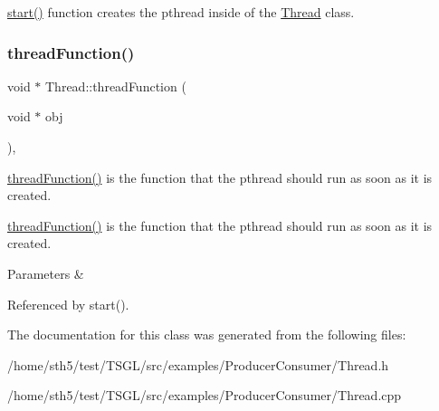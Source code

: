 \hyperlink{class_thread_a1f53ee62bd30a7924186ef26150ce262}{start()} function creates the pthread inside of the \hyperlink{class_thread}{Thread} class. \mbox{\label{class_thread_ae54fcbb9f00b8356b23795ac477f9577}} 
\subsubsection{\texorpdfstring{thread\+Function()}{threadFunction()}}
{\footnotesize\ttfamily void $\ast$ Thread\+::thread\+Function (\begin{DoxyParamCaption}\item[{void $\ast$}]{obj }\end{DoxyParamCaption})\hspace{0.3cm}{\ttfamily [static]}, {\ttfamily [protected]}}



\hyperlink{class_thread_ae54fcbb9f00b8356b23795ac477f9577}{thread\+Function()} is the function that the pthread should run as soon as it is created. 

\hyperlink{class_thread_ae54fcbb9f00b8356b23795ac477f9577}{thread\+Function()} is the function that the pthread should run as soon as it is created. 
\begin{DoxyParams}{Parameters}
{\em } & \\
\hline
\end{DoxyParams}


Referenced by start().



The documentation for this class was generated from the following files\+:\begin{DoxyCompactItemize}
\item 
/home/sth5/test/\+T\+S\+G\+L/src/examples/\+Producer\+Consumer/Thread.\+h\item 
/home/sth5/test/\+T\+S\+G\+L/src/examples/\+Producer\+Consumer/Thread.\+cpp\end{DoxyCompactItemize}
